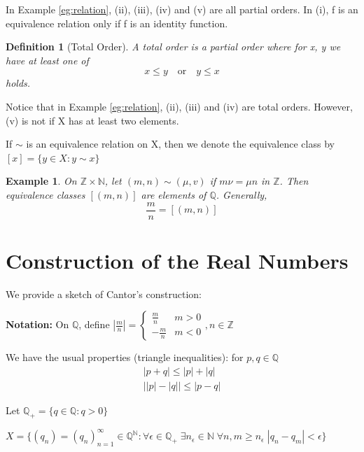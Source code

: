 \documentclass[11pt, oneside]{book}
\theoremstyle{break}
\newtheorem{defn}{Definition}[section]
\newtheorem{eg}{Example}[section]
\newcommand{\bb}[1]{\mathbb{#1}}			%
\begin{document}
In Example \ref{eg:relation}, (ii), (iii), (iv) and (v) are all partial orders. In (i), f is an equivalence relation only if f is an identity function.

\begin{defn}[Total Order]
	A total order is a partial order where for x, y we have at least one of 
	\begin{equation}
		x \leq y \quad \text{or} \quad y \leq x
	\end{equation}
	holds.
\end{defn}

Notice that in Example \ref{eg:relation}, (ii), (iii) and (iv) are total orders. However, (v) is not if X has at least two elements.

If $\sim$ is an equivalence relation on X, then we denote the equivalence class by $[x] = \{y \in X: y \sim x\}$

\begin{eg}
	On $\bb{Z} \times \bb{N}$, let $(m, n) \sim (\mu, v)$ if $m \nu = \mu n$ in $\bb{Z}$. Then equivalence classes $[(m, n)]$ are elements of $\bb{Q}$. Generally,
	\begin{equation}
		\frac{m}{n} = [(m, n)]
	\end{equation}
\end{eg}

\section{Construction of the Real Numbers}\label{sect:construction_R}

We provide a sketch of Cantor's construction:

\textbf{Notation:} On $\bb{Q}$, define $\left|\frac{m}{n}\right| = 
\begin{cases}
  \frac{m}{n} & m > 0 \\
  -\frac{m}{n} & m < 0
\end{cases}
, n \in \bb{Z}$

We have the usual properties (triangle inequalities): for $p, q \in \bb{Q}$
\begin{gather}
  |p + q| \leq |p| + |q| \\
  \big||p| - |q|\big| \leq |p - q|
\end{gather}

Let $\bb{Q}_+ = \{q \in \bb{Q} : q > 0\}$

$X = \{(q_n) = (q_n)_{n = 1}^\infty \in \bb{Q}^{\bb{N}} : \forall \epsilon \in \bb{Q}_+ \; \exists n_{\epsilon} \in \bb{N} \; \forall n, m \geq n_\epsilon \; |q_n - q_m| < \epsilon\}$
\end{document}
